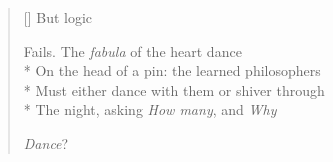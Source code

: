 \label{ch:lear_bi}
\settowidth{\versewidth}{On the head of a pin: the learned philosophers}
\begin{verse}[\versewidth]
 \hspace*{6\vgap} But logic

Fails. The \textit{fabula} of the heart dance\\*
On the head of a pin: the learned philosophers\\*
Must either dance with them or shiver through\\*
The night, asking \textit{How many}, and \textit{Why}

\textit{Dance}?
\end{verse}
